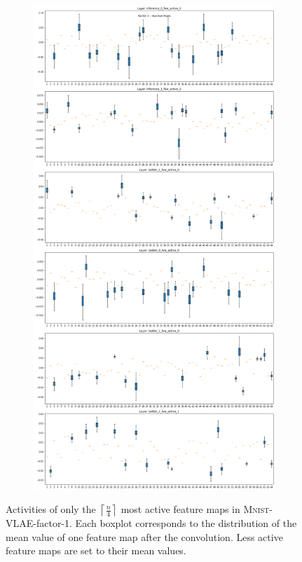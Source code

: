 \begin{figure}[H]
    \centering
    \begin{subfigure}{\textwidth}
        \centering
        \includegraphics[height=.8\textheight]{images/sparseness/encoder_fm1_fms_inactive.png}
    \end{subfigure}
    \caption[\textsc{Mnist}-VLAE-factor-1: Most Active Feature Maps]{Activities of only the $\left \lceil \frac{n}{4} \right \rceil$ most active feature maps in \textsc{Mnist}-\ac{VLAE}-factor-1.
    Each boxplot corresponds to the distribution of the mean value of one feature map after the convolution.
    Less active feature maps are set to their mean values.
    }
\end{figure}

